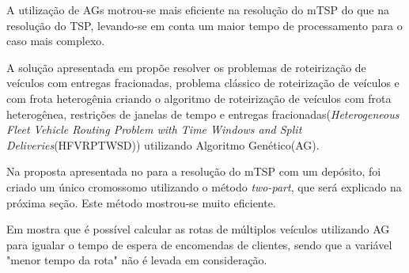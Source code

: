 \documentclass{abnt}
\begin{document}
			A utilização de AGs motrou-se mais eficiente na resolução do mTSP do que na resolução do TSP,  
			levando-se em conta um maior tempo de processamento para o caso mais complexo.

			A solução apresentada em \cite{0006-pdf} propõe resolver os problemas de roteirização de 
			veículos com entregas fracionadas, problema clássico de roteirização de veículos e com 
			frota heterogênia criando o algoritmo de roteirização de veículos com frota heterogênea, 
			restrições de janelas de tempo e entregas fracionadas(\textit{Heterogeneous Fleet Vehicle 
			Routing Problem with Time Windows and Split Deliveries}(HFVRPTWSD)) utilizando Algoritmo 
			Genético(AG).

			Na proposta  apresentada no \cite{0011-pdf} para a resolução do mTSP com um depósito, foi criado um único cromossomo utilizando o método \textit{two-part}, que será explicado na próxima seção. Este método mostrou-se muito eficiente.

			Em \cite{0005-pdf}  mostra que é possível calcular as rotas de múltiplos veículos utilizando AG para igualar o tempo 
			de espera de encomendas de clientes, sendo que a variável "menor tempo da rota" não é levada em consideração.


	
	
	
\end{document}
